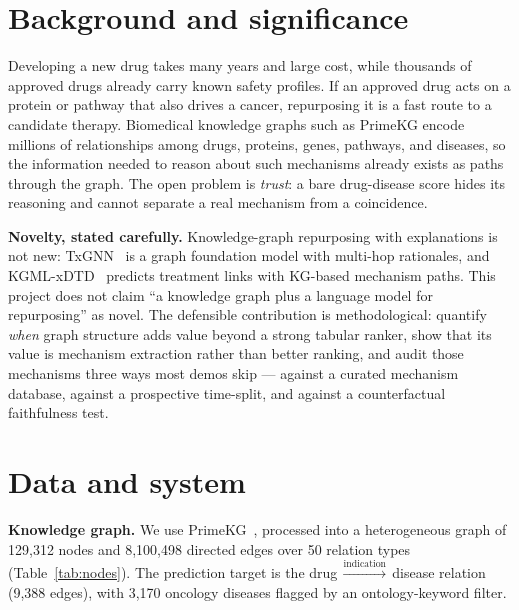 \documentclass[11pt]{article}
\begin{document}
\section{Background and significance}

Developing a new drug takes many years and large cost, while thousands of approved drugs
already carry known safety profiles. If an approved drug acts on a protein or pathway
that also drives a cancer, repurposing it is a fast route to a candidate therapy.
Biomedical knowledge graphs such as PrimeKG encode millions of relationships among drugs,
proteins, genes, pathways, and diseases, so the information needed to reason about such
mechanisms already exists as paths through the graph. The open problem is \emph{trust}: a
bare drug-disease score hides its reasoning and cannot separate a real mechanism from a
coincidence.

\textbf{Novelty, stated carefully.} Knowledge-graph repurposing with explanations is not
new: TxGNN~\cite{txgnn} is a graph foundation model with multi-hop rationales, and
KGML-xDTD~\cite{kgmlxdtd} predicts treatment links with KG-based mechanism paths. This
project does not claim ``a knowledge graph plus a language model for repurposing'' as
novel. The defensible contribution is methodological: quantify \emph{when} graph
structure adds value beyond a strong tabular ranker, show that its value is mechanism
extraction rather than better ranking, and audit those mechanisms three ways most demos
skip --- against a curated mechanism database, against a prospective time-split, and
against a counterfactual faithfulness test.

\section{Data and system}

\textbf{Knowledge graph.} We use PrimeKG~\cite{primekg}, processed into a heterogeneous
graph of 129{,}312 nodes and 8{,}100{,}498 directed edges over 50 relation types
(Table~\ref{tab:nodes}). The prediction target is the
drug\,$\xrightarrow{\text{indication}}$\,disease relation (9{,}388 edges), with 3{,}170
oncology diseases flagged by an ontology-keyword filter.
\end{document}
